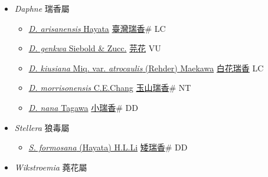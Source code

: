 
  \begin{itemize}
 \item[] \textit{Daphne} 瑞香屬
                    
  \begin{itemize}
        \item[] \href{http://www.theplantlist.org/tpl1.1/search?q=Daphne+arisanensis}{\textit{D. arisanensis} Hayata}   \href{\detokenize{http://taibnet.sinica.edu.tw/chi/taibnet_species_list.php?T2=臺灣瑞香&T2_new_value=true&fr=y}}{臺灣瑞香}\# LC
        \item[] \href{http://www.theplantlist.org/tpl1.1/search?q=Daphne+genkwa}{\textit{D. genkwa} Siebold \& Zucc.}   \href{\detokenize{http://taibnet.sinica.edu.tw/chi/taibnet_species_list.php?T2=芫花&T2_new_value=true&fr=y}}{芫花} VU
        \item[] \href{http://www.theplantlist.org/tpl1.1/search?q=Daphne+kiusiana+var.+atrocaulis}{\textit{D. kiusiana} Miq. var. \textit{atrocaulis} (Rehder) Maekawa}   \href{\detokenize{http://taibnet.sinica.edu.tw/chi/taibnet_species_list.php?T2=白花瑞香&T2_new_value=true&fr=y}}{白花瑞香} LC
        \item[] \href{http://www.theplantlist.org/tpl1.1/search?q=Daphne+morrisonensis}{\textit{D. morrisonensis} C.E.Chang}   \href{\detokenize{http://taibnet.sinica.edu.tw/chi/taibnet_species_list.php?T2=玉山瑞香&T2_new_value=true&fr=y}}{玉山瑞香}\# NT
        \item[] \href{http://www.theplantlist.org/tpl1.1/search?q=Daphne+nana}{\textit{D. nana} Tagawa}   \href{\detokenize{http://taibnet.sinica.edu.tw/chi/taibnet_species_list.php?T2=小瑞香&T2_new_value=true&fr=y}}{小瑞香}\# DD
  \end{itemize}
 \item[] \textit{Stellera} 狼毒屬
                    
  \begin{itemize}
        \item[] \href{http://www.theplantlist.org/tpl1.1/search?q=Stellera+formosana}{\textit{S. formosana} (Hayata) H.L.Li}   \href{\detokenize{http://taibnet.sinica.edu.tw/chi/taibnet_species_list.php?T2=矮瑞香&T2_new_value=true&fr=y}}{矮瑞香}\# DD
  \end{itemize}
 \item[] \textit{Wikstroemia} 蕘花屬
                    

\end{itemize}
